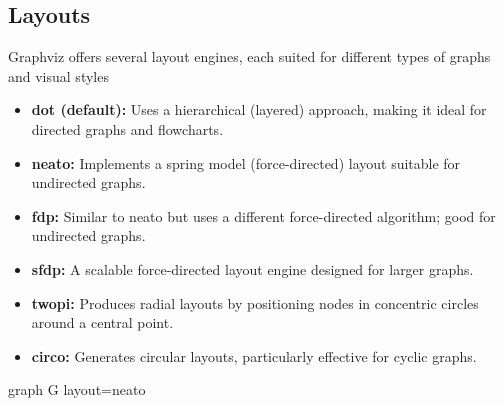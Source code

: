 \documentclass{report}
\begin{document}
     \subsection{Layouts}
     \bigbreak \noindent 
     Graphviz offers several layout engines, each suited for different types of graphs and visual styles
     \begin{itemize}
         \item \textbf{dot (default):} Uses a hierarchical (layered) approach, making it ideal for directed graphs and flowcharts.
         \item \textbf{neato:} Implements a spring model (force-directed) layout suitable for undirected graphs.
         \item \textbf{fdp:} Similar to neato but uses a different force-directed algorithm; good for undirected graphs.
         \item \textbf{sfdp:} A scalable force-directed layout engine designed for larger graphs.
         \item \textbf{twopi:} Produces radial layouts by positioning nodes in concentric circles around a central point.
         \item \textbf{circo:} Generates circular layouts, particularly effective for cyclic graphs.
     \end{itemize}

     \bigbreak \noindent 
     \begin{cppcode}
         graph G {
             layout=neato
         }
     \end{cppcode}
\end{document}
